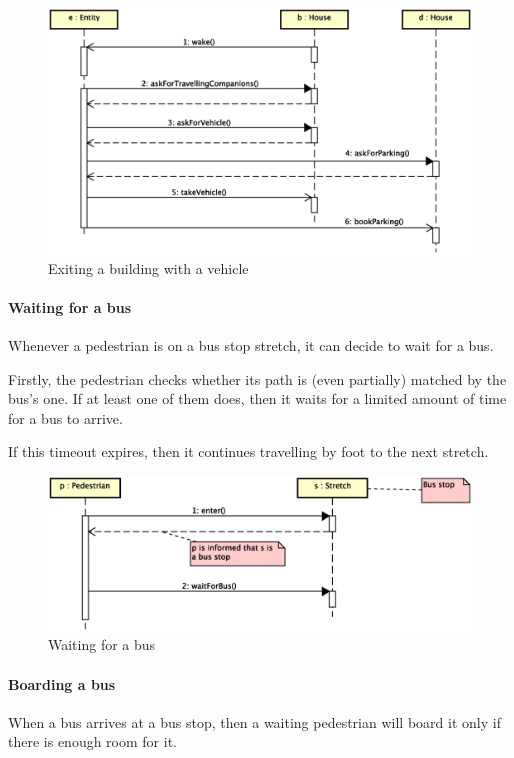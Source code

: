 \begin{figure}[H]
\centering
\includegraphics[width=\columnwidth,trim=1 0 0 0,clip]
  {images/solution/going_out_with_vehicle.eps}
\caption{Exiting a building with a vehicle}
\label{fig:app-inter-vehicle}
\end{figure}

\paragraph{Waiting for a bus}
Whenever a pedestrian is on a bus stop stretch, it can decide to wait for a
bus.

Firstly, the pedestrian checks whether its path is (even partially) matched by
the bus's one.
If at least one of them does, then it waits for a limited amount of time for a
bus to arrive.

If this timeout expires, then it continues travelling by foot to the next
stretch.

\begin{figure}[H]
  \centering
  \includegraphics[width=\columnwidth,trim=1 0 2 0,clip]
    {images/solution/bus_waiting.eps}
  \caption{Waiting for a bus}
  \label{fig:app-inter-wait-bus}
\end{figure}

\paragraph{Boarding a bus}
When a bus arrives at a bus stop, then a waiting pedestrian will board it only
if there is enough room for it.


